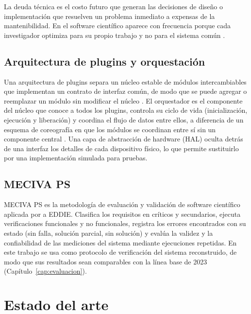 La deuda técnica es el costo futuro que generan las decisiones de diseño o implementación que resuelven un problema inmediato a expensas de la mantenibilidad. En el software científico aparece con frecuencia porque cada investigador optimiza para su propio trabajo y no para el sistema común \citep{ernst2026nature}.

\subsection{Arquitectura de plugins y orquestación}

Una arquitectura de plugins separa un núcleo estable de módulos intercambiables que implementan un contrato de interfaz común, de modo que se puede agregar o reemplazar un módulo sin modificar el núcleo \citep{bustio2013arquitectura}. El orquestador es el componente del núcleo que conoce a todos los plugins, controla su ciclo de vida (inicialización, ejecución y liberación) y coordina el flujo de datos entre ellos, a diferencia de un esquema de coreografía en que los módulos se coordinan entre sí sin un componente central \citep{megargel2021}. Una capa de abstracción de hardware (HAL) oculta detrás de una interfaz los detalles de cada dispositivo físico, lo que permite sustituirlo por una implementación simulada para pruebas.

\subsection{MECIVA PS}

MECIVA PS es la metodología de evaluación y validación de software científico aplicada por \citet{ibaceta2023evaluacion} a EDDIE. Clasifica los requisitos en críticos y secundarios, ejecuta verificaciones funcionales y no funcionales, registra los errores encontrados con su estado (sin falla, solución parcial, sin solución) y evalúa la validez y la confiabilidad de las mediciones del sistema mediante ejecuciones repetidas. En este trabajo se usa como protocolo de verificación del sistema reconstruido, de modo que sus resultados sean comparables con la línea base de 2023 (Capítulo~\ref{cap:evaluacion}).



\section{Estado del arte}

